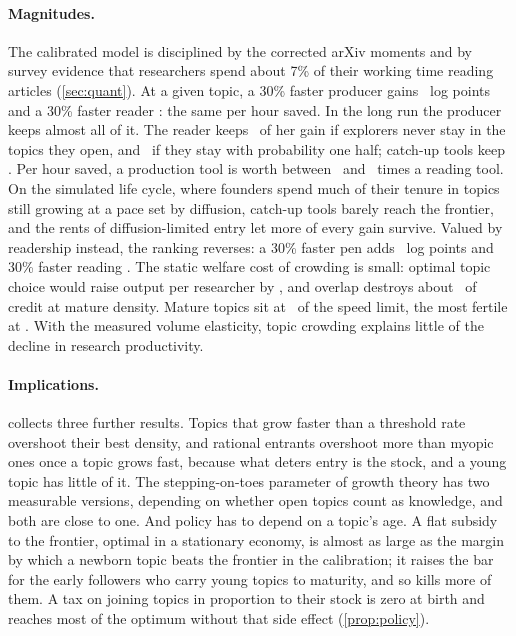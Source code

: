 \paragraph{Magnitudes.} The calibrated model is disciplined by the corrected
arXiv moments and by survey evidence that researchers spend about 7\% of their
working time reading articles \citep{tenopirking2008} (\cref{sec:quant}). At a
given topic, a 30\% faster producer gains \calWriteFixed\ log points and a 30\%
faster reader \calReadFixed: the same per hour saved. In the long run the
producer keeps almost all of it. The reader keeps \calReadPassNoF\ of her gain
if explorers never stay in the topics they open, and \calReadPass\ if they stay
with probability one half; catch-up tools keep \calCatchPass. Per hour saved, a
production tool is worth between \calPerHour\ and \calPerHourNoF\ times a reading
tool. On the simulated life cycle, where founders spend much of their tenure in
topics still growing at a pace set by diffusion, catch-up tools barely reach
the frontier, and the rents of diffusion-limited entry let more of every gain
survive. Valued by readership instead, the ranking reverses: a 30\% faster pen
adds \calAudWrite\ log points and 30\% faster reading \calAudRead. The static
welfare cost of crowding is small: optimal topic choice would raise output per
researcher by \calPlannerGain, and overlap destroys about \calErosion\ of credit
at mature density. Mature topics sit at \calSpeedRatio\ of the speed limit, the
most fertile at \calSpeedRatioTop. With the measured volume elasticity, topic
crowding explains little of the decline in research productivity.

\paragraph{Implications.}  collects three further results.
Topics that grow faster than a threshold rate overshoot their best density, and
rational entrants overshoot more than myopic ones once a topic grows fast,
because what deters entry is the stock, and a young topic has little of it.
The stepping-on-toes parameter of growth theory has two measurable versions,
depending on whether open topics count as knowledge, and both are close to one.
And policy has to depend on a topic's age. A flat subsidy to the frontier,
optimal in a stationary economy, is almost as large as the margin by which a
newborn topic beats the frontier in the calibration; it raises the bar for the
early followers who carry young topics to maturity, and so kills more of them.
A tax on joining topics in proportion to their stock is zero at birth and
reaches most of the optimum without that side effect (\cref{prop:policy}).

